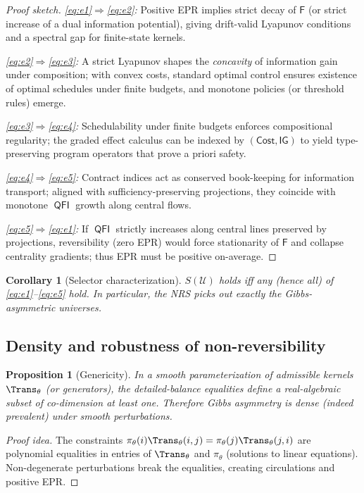 \documentclass[11pt]{article}
\theoremstyle{plain}
\newtheorem{proposition}[theorem]{Proposition}
\newtheorem{corollary}[theorem]{Corollary}
\theoremstyle{definition}
\theoremstyle{remark}
\DeclareMathOperator{\QFI}{\mathsf{QFI}}
\newcommand{\1}{\mathds{1}}
\newcommand{\U}{\mathcal{U}}
\newcommand{\Cost}{\mathsf{Cost}}
\newcommand{\Gain}{\mathsf{IG}}
\newcommand{\Free}{\mathsf{F}}
\begin{document}
\begin{proof}[Proof sketch]
\emph{\ref{eq:e1}$\Rightarrow$\ref{eq:e2}:} Positive EPR implies strict decay of $\Free$ (or strict increase of a dual information potential), giving drift-valid Lyapunov conditions and a spectral gap for finite-state kernels.

\emph{\ref{eq:e2}$\Rightarrow$\ref{eq:e3}:} A strict Lyapunov shapes the \emph{concavity} of information gain under composition; with convex costs, standard optimal control ensures existence of optimal schedules under finite budgets, and monotone policies (or threshold rules) emerge.

\emph{\ref{eq:e3}$\Rightarrow$\ref{eq:e4}:} Schedulability under finite budgets enforces compositional regularity; the graded effect calculus can be indexed by $(\Cost,\Gain)$ to yield type-preserving program operators that prove a priori safety.

\emph{\ref{eq:e4}$\Rightarrow$\ref{eq:e5}:} Contract indices act as conserved book-keeping for information transport; aligned with sufficiency-preserving projections, they coincide with monotone $\QFI$ growth along central flows.

\emph{\ref{eq:e5}$\Rightarrow$\ref{eq:e1}:} If $\QFI$ strictly increases along central lines preserved by projections, reversibility (zero EPR) would force stationarity of $\Free$ and collapse centrality gradients; thus EPR must be positive on-average. 
\end{proof}

\begin{corollary}[Selector characterization]
$S(\U)$ holds iff any (hence all) of \ref{eq:e1}--\ref{eq:e5} hold. In particular, the NRS picks out exactly the Gibbs-asymmetric universes.
\end{corollary}

\subsection{Density and robustness of non-reversibility}
\begin{proposition}[Genericity]
\label{prop:density}
In a smooth parameterization of admissible kernels $\Trans_\theta$ (or generators), the detailed-balance equalities define a real-algebraic subset of co-dimension at least one. Therefore Gibbs asymmetry is dense (indeed prevalent) under smooth perturbations.
\end{proposition}

\begin{proof}[Proof idea]
The constraints $\pi_\theta(i)\Trans_\theta(i,j)=\pi_\theta(j)\Trans_\theta(j,i)$ are polynomial equalities in entries of $\Trans_\theta$ and $\pi_\theta$ (solutions to linear equations). Non-degenerate perturbations break the equalities, creating circulations and positive EPR.
\end{proof}
\end{document}
